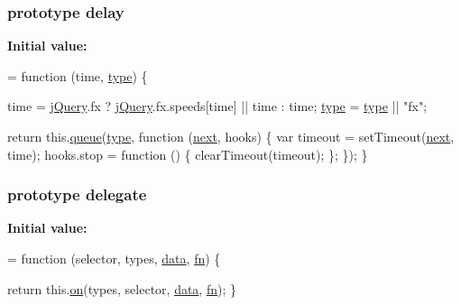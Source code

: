 \subsubsection[{\texorpdfstring{delay}{delay}}]{ {\bf prototype} delay}\hypertarget{jquery-2_82_81-vsdoc_8js_a90055e3b93c579a9e3f764ee3c04639a}{}\label{jquery-2_82_81-vsdoc_8js_a90055e3b93c579a9e3f764ee3c04639a}
{\bfseries Initial value\+:}
\begin{DoxyCode}
= \textcolor{keyword}{function} (time, \hyperlink{jquery-2_82_81-vsdoc_8js_a3940565e83a9bfd10d95ffd27536da91}{type}) \{
        

        time = \hyperlink{jquery-2_82_81-vsdoc_8js_add5237586d970a38a81f990e8eb28c6c}{jQuery}.fx ? \hyperlink{jquery-2_82_81-vsdoc_8js_add5237586d970a38a81f990e8eb28c6c}{jQuery}.fx.speeds[time] || time : time;
        \hyperlink{jquery-2_82_81-vsdoc_8js_a3940565e83a9bfd10d95ffd27536da91}{type} = \hyperlink{jquery-2_82_81-vsdoc_8js_a3940565e83a9bfd10d95ffd27536da91}{type} || \textcolor{stringliteral}{"fx"};

        \textcolor{keywordflow}{return} this.\hyperlink{jquery-2_82_81-vsdoc_8js_a4a4ce67ab280eb2cff0622a3bdc1f5b3}{queue}(\hyperlink{jquery-2_82_81-vsdoc_8js_a3940565e83a9bfd10d95ffd27536da91}{type}, \textcolor{keyword}{function} (\hyperlink{jquery-2_82_81-vsdoc_8js_a61213ec31ab21de6b8fbe75332157524}{next}, hooks) \{
            var timeout = setTimeout(\hyperlink{jquery-2_82_81-vsdoc_8js_a61213ec31ab21de6b8fbe75332157524}{next}, time);
            hooks.stop = \textcolor{keyword}{function} () \{
                clearTimeout(timeout);
            \};
        \});
    \}
\end{DoxyCode}
\subsubsection[{\texorpdfstring{delegate}{delegate}}]{ {\bf prototype} delegate}\hypertarget{jquery-2_82_81-vsdoc_8js_ae4da2f4e8142373574611015d628a5f0}{}\label{jquery-2_82_81-vsdoc_8js_ae4da2f4e8142373574611015d628a5f0}
{\bfseries Initial value\+:}
\begin{DoxyCode}
= \textcolor{keyword}{function} (selector, types, \hyperlink{jquery-2_82_81-vsdoc_8js_a609407b3456fdc3c5671a9fc4a226ff7}{data}, \hyperlink{jquery-2_82_81-vsdoc_8js_acef6bdaf6b9b20fdcca1ea86f0902c3b}{fn}) \{
        

        \textcolor{keywordflow}{return} this.\hyperlink{jquery-2_82_81-vsdoc_8js_ae453b412b883f60220d73468ef6c6dbc}{on}(types, selector, \hyperlink{jquery-2_82_81-vsdoc_8js_a609407b3456fdc3c5671a9fc4a226ff7}{data}, \hyperlink{jquery-2_82_81-vsdoc_8js_acef6bdaf6b9b20fdcca1ea86f0902c3b}{fn});
    \}
\end{DoxyCode}
